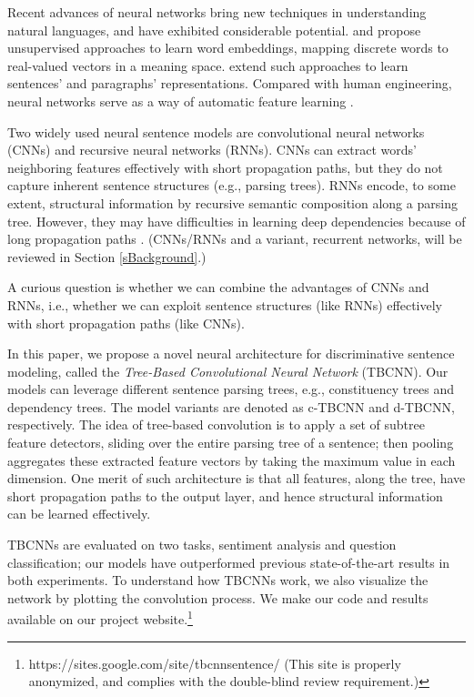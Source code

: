 \documentclass[11pt,a4paper]{article}
\begin{document}
Recent advances of neural networks bring new techniques in understanding natural languages, 
and have exhibited considerable potential.
 and  propose
unsupervised approaches to learn word embeddings,
mapping discrete words to real-valued vectors in a meaning space.
 extend such approaches to learn sentences' and paragraphs'
representations.
Compared with human engineering, 
neural networks serve as a way of automatic feature learning \cite{RL}.


Two widely used neural sentence models are
convolutional neural networks (CNNs) and recursive neural networks (RNNs). CNNs can extract words' 
neighboring features effectively with short propagation paths,
but they do not capture inherent sentence structures (e.g., parsing trees).
RNNs encode, to some extent, structural information by 
recursive semantic composition 
along a parsing tree. 
However, they may have difficulties in learning deep dependencies because of
long propagation paths \cite{difficulty}.
(CNNs/RNNs and a variant, recurrent networks, will be reviewed in Section \ref{sBackground}.)

A curious question is whether we can combine the advantages of CNNs and RNNs,
i.e., whether we can exploit sentence structures (like RNNs)
effectively with short propagation paths (like CNNs).

In this paper, we propose a novel neural architecture for discriminative sentence modeling,
called the \textit{Tree-Based Convolutional Neural Network} (TBCNN).
Our models can leverage different sentence parsing trees, e.g.,
constituency trees and dependency trees. The model variants are denoted as c-TBCNN and d-TBCNN, respectively.
The idea of tree-based convolution is to apply a set of subtree feature detectors,
sliding over the entire parsing tree of a sentence; 
then pooling aggregates these extracted feature vectors by taking the maximum value in each dimension.
One merit of such architecture is that all features, along the tree, have short propagation paths
to the output layer, and hence structural information can be learned effectively.


TBCNNs are evaluated on two tasks, sentiment analysis and question classification;
our models have outperformed previous state-of-the-art results in both experiments.
To understand how TBCNNs work, we also visualize the network by plotting the convolution process.
We make our code and results available on our project website.\footnote{
https://sites.google.com/site/tbcnnsentence/ (This site is properly anonymized, and complies with the double-blind review requirement.)}
\end{document}
